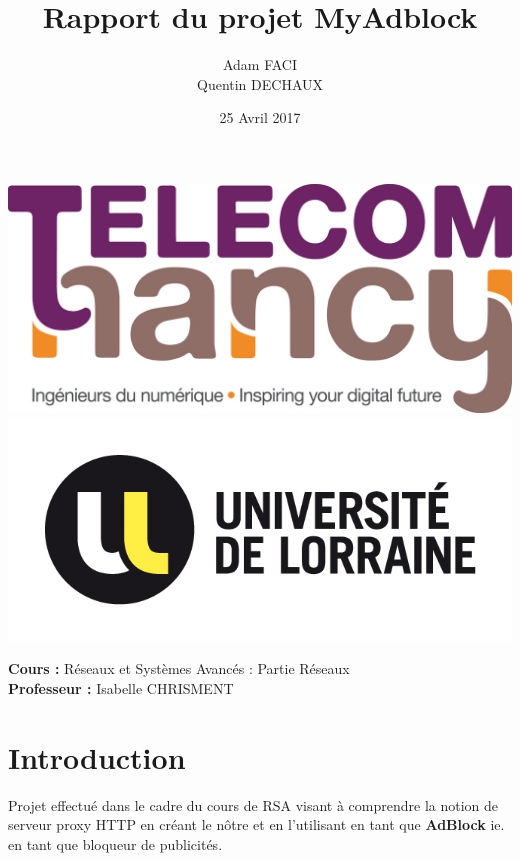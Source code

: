 \documentclass[12 pt,a4paper,frenchb]{article}
\title{Rapport du projet MyAdblock}
\author{Adam FACI \\ Quentin DECHAUX}
\date{25 Avril 2017}
\begin{document}
\begin{titlingpage}
  \includegraphics[scale = 0.6]{TNCY.jpg}
  \includegraphics[scale = 1.2]{UL.jpg}
  \begin{center}
    \vspace{4cm}
    \textbf{\Huge{\thetitle}}\par
    \vspace{1.5cm}
    \theauthor\par
    \vspace{2cm}
    \thedate
    \vspace{4cm}
  \end{center}
  \textbf{Cours :} Réseaux et Systèmes Avancés : Partie Réseaux\\
  \textbf{Professeur :} Isabelle CHRISMENT
\end{titlingpage}

\tableofcontents
\thispagestyle{empty}

\newpage
\setcounter{page}{1}

\section{Introduction}

Projet effectué dans le cadre du cours de RSA visant à comprendre la notion de serveur proxy HTTP en créant le nôtre et en l'utilisant en tant que \textbf{AdBlock} ie. en tant que bloqueur de publicités.
\end{document}
